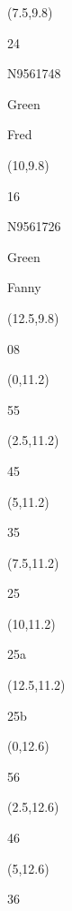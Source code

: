 \documentclass[a4paper]{article}
\newcommand{\myseat}[4]{%
\vspace{-0.1cm}
\parbox[t][2.2cm][t]{3.5cm}{
\small #1 %
\begin{description}
\vspace{-0.1cm}
\item [ID:] #2
\vspace{-0.1cm}
\item [Team:] #3 \normalsize
\vspace{-0.1cm}
\item \normalsize #4
\vspace{-0.1cm}
\end{description}
}
}
\begin{document}
\begin{CJK}{UTF8}{cyberbit}
\begin{textblock}{2.5}(7.5,9.8)
\myseat{24}{N9561748}{Green}{Fred}
\end{textblock}

\begin{textblock}{2.5}(10,9.8)
\myseat{16}{N9561726}{Green}{Fanny}
\end{textblock}

\begin{textblock}{2.5}(12.5,9.8)
\textblockcolor{}
\myseat{08}{}{}{}
\end{textblock}

\begin{textblock}{2.5}(0,11.2)
\textblockcolor{}
\myseat{55}{}{}{}
\end{textblock}

\begin{textblock}{2.5}(2.5,11.2)
\textblockcolor{}
\myseat{45}{}{}{}
\end{textblock}

\begin{textblock}{2.5}(5,11.2)
\textblockcolor{}
\myseat{35}{}{}{}
\end{textblock}

\begin{textblock}{2.5}(7.5,11.2)
\textblockcolor{}
\myseat{25}{}{}{}
\end{textblock}

\begin{textblock}{2.5}(10,11.2)
\textblockcolor{}
\myseat{25a}{}{}{}
\end{textblock}

\begin{textblock}{2.5}(12.5,11.2)
\textblockcolor{}
\myseat{25b}{}{}{}
\end{textblock}

\begin{textblock}{2.5}(0,12.6)
\textblockcolor{}
\myseat{56}{}{}{}
\end{textblock}

\begin{textblock}{2.5}(2.5,12.6)
\textblockcolor{}
\myseat{46}{}{}{}
\end{textblock}

\begin{textblock}{2.5}(5,12.6)
\textblockcolor{}
\myseat{36}{}{}{}
\end{textblock}


\end{CJK}
\end{document}
